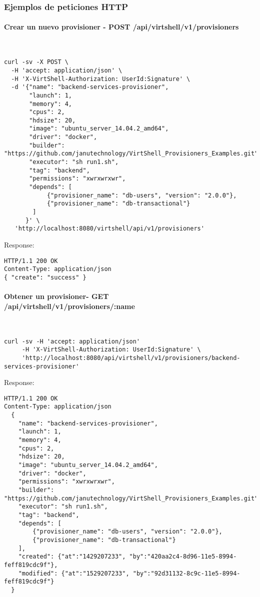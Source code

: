 \subsubsection{Ejemplos de peticiones HTTP}

\paragraph{Crear un nuevo provisioner - POST /api/virtshell/v1/provisioners} ~\\


\begin{lstlisting}[style=json]
curl -sv -X POST \
  -H 'accept: application/json' \
  -H 'X-VirtShell-Authorization: UserId:Signature' \
  -d '{"name": "backend-services-provisioner",
       "launch": 1,
       "memory": 4,
       "cpus": 2,
       "hdsize": 20,
       "image": "ubuntu_server_14.04.2_amd64",
       "driver": "docker",
       "builder": "https://github.com/janutechnology/VirtShell_Provisioners_Examples.git",
       "executor": "sh run1.sh",
       "tag": "backend",
       "permissions": "xwrxwrxwr",
       "depends": [
            {"provisioner_name": "db-users", "version": "2.0.0"},
            {"provisioner_name": "db-transactional"}
        ]
      }' \
   'http://localhost:8080/virtshell/api/v1/provisioners'
\end{lstlisting}

Response:

\begin{lstlisting}[style=json]
HTTP/1.1 200 OK
Content-Type: application/json
{ "create": "success" }
\end{lstlisting}

\paragraph{Obtener un provisioner- GET \\ /api/virtshell/v1/provisioners/:name} ~\\

\begin{lstlisting}[style=json]
curl -sv -H 'accept: application/json' 
     -H 'X-VirtShell-Authorization: UserId:Signature' \ 
     'http://localhost:8080/api/virtshell/v1/provisioners/backend-services-provisioner'
\end{lstlisting}

Response:

\begin{lstlisting}[style=json]
HTTP/1.1 200 OK
Content-Type: application/json
  {
    "name": "backend-services-provisioner",
    "launch": 1,
    "memory": 4,
    "cpus": 2,
    "hdsize": 20,
    "image": "ubuntu_server_14.04.2_amd64",
    "driver": "docker",
    "permissions": "xwrxwrxwr",
    "builder": "https://github.com/janutechnology/VirtShell_Provisioners_Examples.git",
    "executor": "sh run1.sh",
    "tag": "backend",
    "depends": [
        {"provisioner_name": "db-users", "version": "2.0.0"},
        {"provisioner_name": "db-transactional"}
    ],
    "created": {"at":"1429207233", "by":"420aa2c4-8d96-11e5-8994-feff819cdc9f"},
    "modified": {"at":"1529207233", "by":"92d31132-8c9c-11e5-8994-feff819cdc9f"}    
  }
\end{lstlisting}

